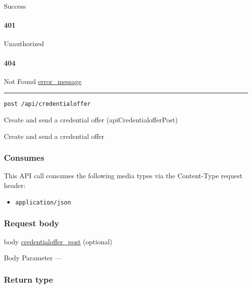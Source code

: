 Success

\hypertarget{section-125}{%
\paragraph{401}\label{section-125}}

Unauthorized \protect\hyperlink{}{}

\hypertarget{section-126}{%
\paragraph{404}\label{section-126}}

Not Found \protect\hyperlink{error_message}{error\_message}

\begin{center}\rule{0.5\linewidth}{\linethickness}\end{center}

\protect\hypertarget{apiCredentialofferPost}{}{}

\begin{verbatim}
post /api/credentialoffer
\end{verbatim}

Create and send a credential offer ({apiCredentialofferPost})

Create and send a credential offer

\hypertarget{consumes-12}{%
\subsubsection{Consumes}\label{consumes-12}}

This API call consumes the following media types via the {Content-Type}
request header:

\begin{itemize}
\tightlist
\item
  \texttt{application/json}
\end{itemize}

\hypertarget{request-body-12}{%
\subsubsection{Request body}\label{request-body-12}}

body \protect\hyperlink{credentialoffer_post}{credentialoffer\_post}
(optional)

{Body Parameter} ---

\hypertarget{return-type-30}{%
\subsubsection{Return type}\label{return-type-30}}

